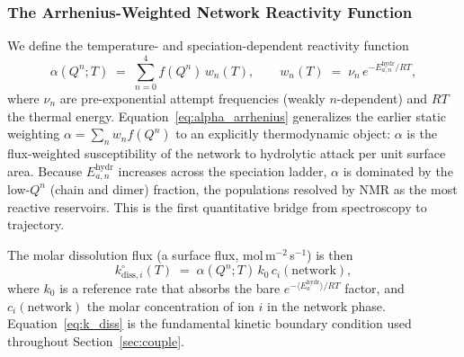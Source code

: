 \documentclass[11pt]{article}
\begin{document}
\subsubsection{The Arrhenius-Weighted Network Reactivity Function}


We define the temperature- and speciation-dependent reactivity function
\begin{equation}
\alpha(Q^n;T) \;=\; \sum_{n=0}^{4} f(Q^n)\,w_n(T),\qquad
w_n(T)\;=\;\nu_n\,e^{-E_{a,n}^{\mathrm{hydr}}/RT},
\label{eq:alpha_arrhenius}
\end{equation}
where $\nu_n$ are pre-exponential attempt frequencies (weakly $n$-dependent) and $RT$ the thermal energy. Equation~\eqref{eq:alpha_arrhenius} generalizes the earlier static weighting $\alpha=\sum_n w_n f(Q^n)$ \cite{Workie2025b} to an explicitly thermodynamic object: $\alpha$ is the flux-weighted susceptibility of the network to hydrolytic attack per unit surface area. Because $E_{a,n}^{\mathrm{hydr}}$ increases across the speciation ladder, $\alpha$ is dominated by the low-$Q^n$ (chain and dimer) fraction, the populations resolved by NMR as the most reactive reservoirs. This is the first quantitative bridge from spectroscopy to trajectory.


The molar dissolution flux (a surface flux, mol\,m$^{-2}$\,s$^{-1}$) is then
\begin{equation}
k_{\mathrm{diss},i}^{\circ}(T) \;=\; \alpha(Q^n;T)\,k_0\,c_i(\mathrm{network}),
\label{eq:k_diss}
\end{equation}
where $k_0$ is a reference rate that absorbs the bare $e^{-\langle E_a^{\mathrm{hydr}}\rangle/RT}$ factor, and $c_i(\mathrm{network})$ the molar concentration of ion $i$ in the network phase. Equation~\eqref{eq:k_diss} is the fundamental kinetic boundary condition used throughout Section~\ref{sec:couple}.
\end{document}
